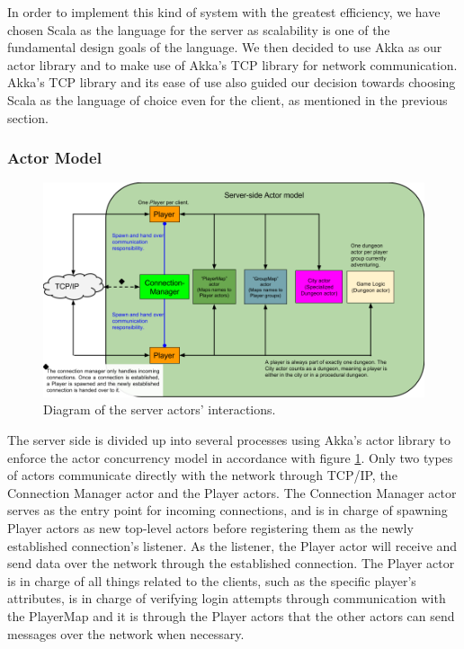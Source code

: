 \documentclass[a4paper]{article}
\begin{document}
In order to implement this kind of system with the greatest efficiency, we have chosen Scala as the language for the server as scalability is one of the fundamental design goals 
of the language. We then decided to use Akka as our actor library and to make use of Akka's TCP library for network communication. Akka's TCP library and its ease of use also 
guided our decision towards choosing Scala as the language of choice even for the client, as mentioned in the previous section.

\subsubsection{Actor Model}
\begin{figure}[ht]
\centering
\includegraphics[width=1.0\textwidth]{serveractormodel}
\caption{\label{fig:ServerActorModel}Diagram of the server actors' interactions.}
\end{figure}
The server side is divided up into several processes using Akka's actor library to enforce the actor concurrency model in accordance with figure \ref{fig:ServerActorModel}. Only two types 
of actors communicate directly with the network through TCP/IP, the Connection Manager actor and the Player actors. The Connection Manager actor serves as the entry point for incoming
connections, and is in charge of spawning Player actors as new top-level actors before registering them as the newly established connection's listener. As the listener, the Player actor
will receive and send data over the network through the established connection. The Player actor is in charge of all things related to the clients, such as the specific player's attributes,
is in charge of verifying login attempts through communication with the PlayerMap and it is through the Player actors that the other actors can send messages over the network when necessary.
\end{document}
